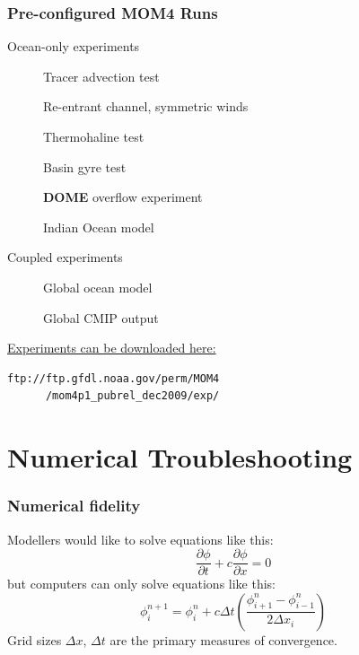 \documentclass[red]{beamer}
\begin{document}
\begin{frame}[fragile]
    \frametitle{Pre-configured MOM4 Runs}
   
    Ocean-only experiments
    \begin{description}
        \item[] Tracer advection test
        \item[] Re-entrant channel, symmetric winds
        \item[] Thermohaline test
        \item[] Basin gyre test
        \item[] \textbf{DOME} overflow experiment
        \item[] Indian Ocean model
    \end{description}
    
    Coupled experiments
    \begin{description}
        \item[] Global ocean model
        \item[] Global CMIP output
    \end{description}
    
    \href{ftp://ftp.gfdl.noaa.gov/perm/MOM4/mom4p1_pubrel_dec2009/exp/}
    {Experiments can be downloaded here:}
    \begin{lstlisting}
ftp://ftp.gfdl.noaa.gov/perm/MOM4
      /mom4p1_pubrel_dec2009/exp/
    \end{lstlisting}
\end{frame}

\section{Numerical Troubleshooting}
\begin{frame}
    \frametitle{Numerical fidelity}
    
    Modellers would like to solve equations like this:
    $$
    \frac{\partial \phi}{\partial t} + c \frac{\partial \phi}{\partial x} = 0
    $$
    but computers can only solve equations like this:
    $$
    \phi^{n+1}_i = \phi^n_i + c \Delta t
        \left(\frac{\phi^n_{i+1} - \phi^n_{i-1}}{2\Delta x_i} \right)
    $$
    Grid sizes $\Delta x$, $\Delta t$ are the primary measures of convergence.
\end{frame}
\end{document}
